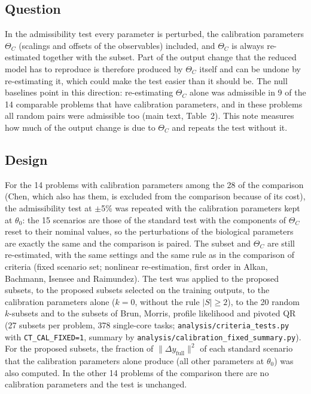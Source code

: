 

\subsection*{Question}
In the admissibility test every parameter is perturbed, the calibration parameters $\Theta_C$ (scalings and offsets of the observables) included, and $\Theta_C$ is always re-estimated together with the subset. Part of the output change that the reduced model has to reproduce is therefore produced by $\Theta_C$ itself and can be undone by re-estimating it, which could make the test easier than it should be. The null baselines point in this direction: re-estimating $\Theta_C$ alone was admissible in 9 of the 14 comparable problems that have calibration parameters, and in these problems all random pairs were admissible too (main text, Table~2). This note measures how much of the output change is due to $\Theta_C$ and repeats the test without it.

\subsection*{Design}
For the 14 problems with calibration parameters among the 28 of the comparison (Chen, which also has them, is excluded from the comparison because of its cost), the admissibility test at $\pm$5\% was repeated with the calibration parameters kept at $\theta_0$: the 15 scenarios are those of the standard test with the components of $\Theta_C$ reset to their nominal values, so the perturbations of the biological parameters are exactly the same and the comparison is paired. The subset and $\Theta_C$ are still re-estimated, with the same settings and the same rule as in the comparison of criteria (fixed scenario set; nonlinear re-estimation, first order in Alkan, Bachmann, Isensee and Raimundez). The test was applied to the proposed subsets, to the proposed subsets selected on the training outputs, to the calibration parameters alone ($k=0$, without the rule $|S|\ge2$), to the 20 random $k$-subsets and to the subsets of Brun, Morris, profile likelihood and pivoted QR (27 subsets per problem, 378 single-core tasks; \texttt{analysis/criteria\_tests.py} with \texttt{CT\_CAL\_FIXED=1}, summary by \texttt{analysis/calibration\_fixed\_summary.py}). For the proposed subsets, the fraction of $\|\Delta y_{\mathrm{full}}\|^2$ of each standard scenario that the calibration parameters alone produce (all other parameters at $\theta_0$) was also computed. In the other 14 problems of the comparison there are no calibration parameters and the test is unchanged.

